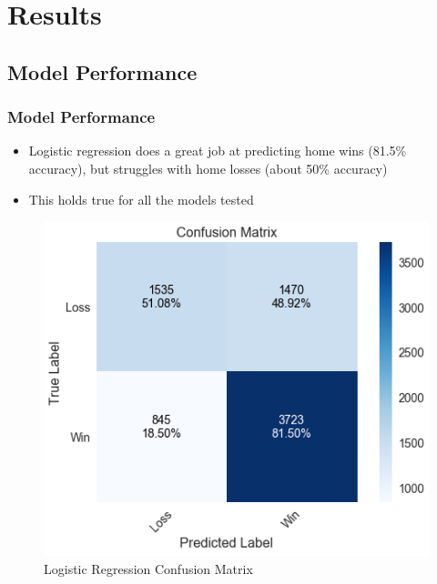 \documentclass{beamer}
\begin{document}
\section{Results}

\subsection{Model Performance}
\begin{frame}
\frametitle{Model Performance}
\begin{itemize}
    \item Logistic regression does a great job at predicting home wins (81.5\% accuracy), but struggles with home losses (about 50\% accuracy)
    \item This holds true for all the models tested
\end{itemize}
\begin{figure}
\includegraphics[scale=0.35]{../docs/assets/images/model-performance/logistic-regression-confusion-matrix.png}
\caption{Logistic Regression Confusion Matrix}
\end{figure}
\end{frame}
\end{document}
